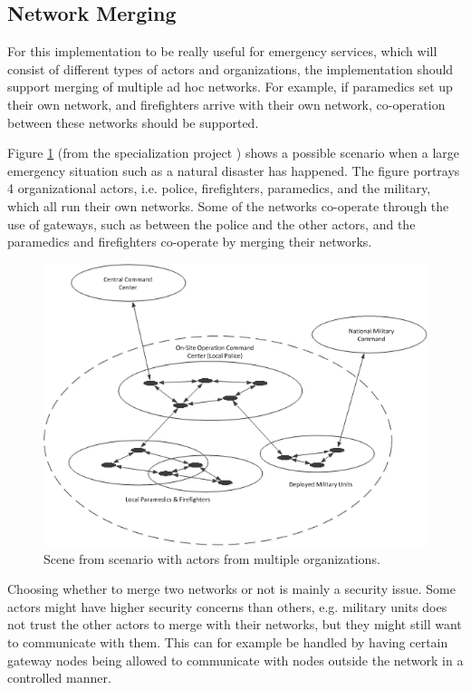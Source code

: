 \subsection{Network Merging}
For this implementation to be really useful for emergency services, which will
consist of different types of actors and organizations, the implementation
should support merging of multiple ad hoc networks. For example, if paramedics
set up their own network, and firefighters arrive with their own network,
co-operation between these networks should be supported.

Figure \ref{fig:scenario_networks} (from the specialization
project \cite{bowitz_graarud}) shows a possible scenario when a large emergency
situation such as a natural disaster has happened. The figure portrays 4
organizational actors, i.e. police, firefighters, paramedics, and the military,
which all run their own networks. Some of the networks co-operate through the
use of gateways, such as between the police and the other actors, and the
paramedics and firefighters co-operate by merging their networks.

\begin{figure}[h]
	\centering
  	\includegraphics[width=\textwidth]{images/scenario.png}
  	\caption{Scene from scenario with actors from multiple organizations.}
	\label{fig:scenario_networks}
\end{figure}

Choosing whether to merge two networks or not is mainly a security issue. Some
actors might have higher security concerns than others, e.g. military units does
not trust the other actors to merge with their networks, but they might still want
to communicate with them. This can for example be handled by having certain
gateway nodes being allowed to communicate with nodes outside the network in a
controlled manner.

